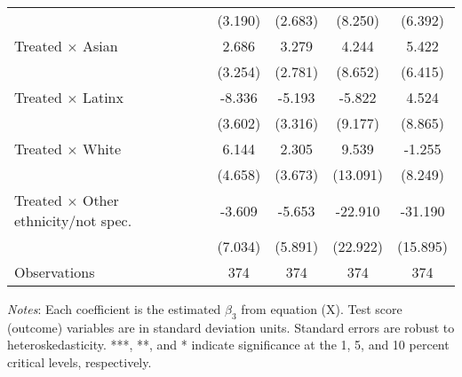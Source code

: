 \begin{table}[htbp]
\begin{threeparttable}
\begin{tabular}{l*{4}{c}}
                    &     (3.190)         &     (2.683)         &     (8.250)         &     (6.392)         \\
[1em]
Treated $\times$ Asian&       2.686         &       3.279         &       4.244         &       5.422         \\
                    &     (3.254)         &     (2.781)         &     (8.652)         &     (6.415)         \\
[1em]
Treated $\times$ Latinx&      -8.336\sym{*}  &      -5.193         &      -5.822         &       4.524         \\
                    &     (3.602)         &     (3.316)         &     (9.177)         &     (8.865)         \\
[1em]
Treated $\times$ White&       6.144         &       2.305         &       9.539         &      -1.255         \\
                    &     (4.658)         &     (3.673)         &    (13.091)         &     (8.249)         \\
[1em]
Treated $\times$ Other ethnicity/not spec.&      -3.609         &      -5.653         &     -22.910         &     -31.190         \\
                    &     (7.034)         &     (5.891)         &    (22.922)         &    (15.895)         \\
\midrule
Observations        &         374         &         374         &         374         &         374         \\
\bottomrule \end{tabular} \begin{tablenotes} \item \textit{Notes}: Each coefficient is the estimated $\beta_3$ from equation (X). Test score (outcome) variables are in standard deviation units. Standard errors are robust to heteroskedasticity. ***, **, and * indicate significance at the 1, 5, and 10 percent critical levels, respectively. \end{tablenotes} \end{threeparttable} \end{table}

